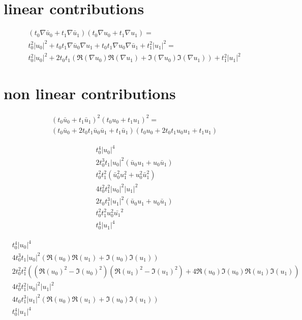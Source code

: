 \documentclass[12pt,a4paper]{article}
\author{Želimir Marojević}
\begin{document}
\section{linear contributions}

\begin{align}
&\left( t_0 \nabla \bar{u}_0 + t_1 \nabla \bar{u}_1 \right) \left( t_0 \nabla u_0 + t_1 \nabla u_1 \right) = \\
&t_0^2 \vert u_0 \vert^2 + t_0 t_1 \nabla \bar{u}_0 \nabla u_1  + t_0 t_1 \nabla u_0 \nabla \bar{u}_1 + t_1^2 \vert u_1 \vert^2 = \\
&t_0^2 \vert u_0 \vert^2 + 2 t_0 t_1 ( \Re(\nabla u_0) \Re(\nabla u_1) + \Im(\nabla u_0) \Im(\nabla u_1) ) + t_1^2 \vert u_1 \vert^2 
\end{align}


\section{non linear contributions}

\begin{align}
&\left( t_0 \bar{u}_0 + t_1 \bar{u}_1 \right)^2 \left( t_0 u_0 + t_1 u_1 \right)^2 = \\
&\left( t_0 \bar{u}_0 + 2 t_0 t_1 \bar{u}_0 \bar{u}_1 + t_1 \bar{u}_1 \right) \left( t_0 u_0 + 2 t_0 t_1 u_0 u_1 + t_1 u_1 \right)
\end{align}

\begin{align}
&t_0^4 \vert u_0 \vert^4 \\
&2 t_0^3 t_1 \vert u_0 \vert^2 ( \bar{u}_0  u_1 + u_0 \bar{u}_1 ) \\
&t_0^2 t_1^2 ( \bar{u}_0^2 u_1^2 + u_0^2 \bar{u}_1^2 ) \\
&4 t_0^2 t_1^2 \vert u_0 \vert^2 \vert u_1 \vert^2 \\
&2 t_0 t_1^3 \vert u_1 \vert^2 ( \bar{u}_0 u_1 + u_0 \bar{u}_1 ) \\
&t_0^2 t_1^2 u_0^2 \bar{u_1}^2 \\
& t_0^4 \vert u_1 \vert^4
\end{align}

\begin{align}
&t_0^4 \vert u_0 \vert^4 \\
&4 t_0^3 t_1 \vert u_0 \vert^2 ( \Re(u_0) \Re(u_1) + \Im(u_0) \Im(u_1) ) \\
&2 t_0^2 t_1^2 ( (\Re(u_0)^2 - \Im(u_0)^2) (\Re(u_1)^2 - \Im(u_1)^2)  + 4 \Re(u_0) \Im(u_0) \Re(u_1)  \Im(u_1) )\\
&4 t_0^2 t_1^2 \vert u_0 \vert^2 \vert u_1 \vert^2 \\
&4 t_0 t_1^3 \vert u_1 \vert^2 ( \Re(u_0) \Re(u_1) + \Im(u_0) \Im(u_1) ) \\
& t_0^4 \vert u_1 \vert^4
\end{align}
\end{document}
